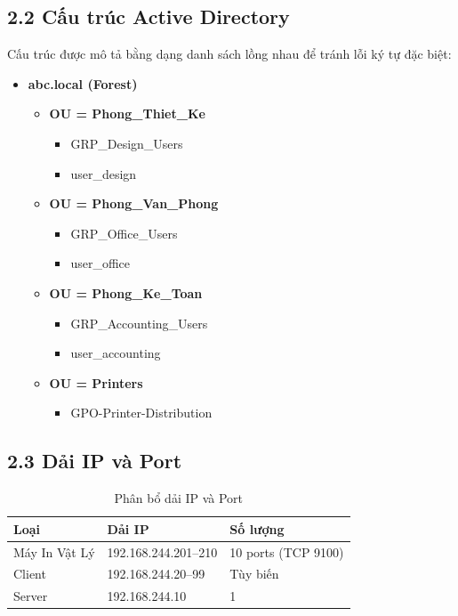 \subsection*{2.2 Cấu trúc Active Directory}

Cấu trúc được mô tả bằng dạng danh sách lồng nhau để tránh lỗi ký tự đặc biệt:

\begin{itemize}
    \item \textbf{abc.local (Forest)}
    \begin{itemize}
        \item \textbf{OU = Phong\_Thiet\_Ke}
        \begin{itemize}
            \item GRP\_Design\_Users
            \item user\_design
        \end{itemize}
        \item \textbf{OU = Phong\_Van\_Phong}
        \begin{itemize}
            \item GRP\_Office\_Users
            \item user\_office
        \end{itemize}
        \item \textbf{OU = Phong\_Ke\_Toan}
        \begin{itemize}
            \item GRP\_Accounting\_Users
            \item user\_accounting
        \end{itemize}
        \item \textbf{OU = Printers}
        \begin{itemize}
            \item GPO-Printer-Distribution
        \end{itemize}
    \end{itemize}
\end{itemize}

\subsection*{2.3 Dải IP và Port}

\begin{table}[h]
\centering
\begin{tabular}{|l|l|p{6cm}|}
\hline
\textbf{Loại} & \textbf{Dải IP} & \textbf{Số lượng} \\
\hline
Máy In Vật Lý & 192.168.244.201–210 & 10 ports (TCP 9100) \\
\hline
Client & 192.168.244.20–99 & Tùy biến \\
\hline
Server & 192.168.244.10 & 1 \\
\hline
\end{tabular}
\caption{Phân bổ dải IP và Port}
\label{tab:ip_port}
\end{table}

